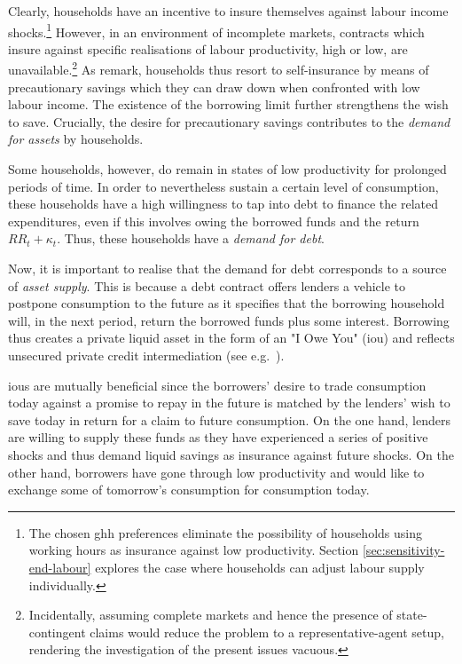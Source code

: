 \documentclass[a4paper,12pt]{article} %
\numberwithin{equation}{section} %
\numberwithin{figure}{section}
\numberwithin{table}{section}
\begin{document}
Clearly, households have an incentive to insure themselves against labour income shocks.\footnote{The chosen \Gls{ghh} preferences eliminate the possibility of households using working hours as insurance against low productivity. Section \ref{sec:sensitivity-end-labour} explores the case where households can adjust labour supply individually.} However, in an environment of incomplete markets, contracts which insure against specific realisations of labour productivity, high or low, are unavailable.\footnote{Incidentally, assuming complete markets and hence the presence of state-contingent claims would reduce the problem to a representative-agent setup, rendering the investigation of the present issues vacuous.} As \textcite{heath2009} remark, households thus resort to self-insurance by means of precautionary savings which they can draw down when confronted with low labour income. The existence of the borrowing limit further strengthens the wish to save. Crucially, the desire for precautionary savings contributes to the \textit{demand for assets} by households. 

Some households, however, do remain in states of low productivity for prolonged periods of time. In order to nevertheless sustain a certain level of consumption, these households have a high willingness to tap into debt to finance the related expenditures, even if this involves owing the borrowed funds and the return $RR_t + \kappa_t$. Thus, these households have a \textit{demand for debt}.

Now, it is important to realise that the demand for debt corresponds to a source of \textit{asset supply}. This is because a debt contract offers lenders a vehicle to postpone consumption to the future as it specifies that the borrowing household will, in the next period, return the borrowed funds plus some interest. Borrowing thus creates a private liquid asset in the form of an "I Owe You" (\Gls{iou}) and reflects unsecured private credit intermediation (see e.g.~\cite{bayer2023}).

\Gls{iou}s are mutually beneficial since the borrowers' desire to trade consumption today against a promise to repay in the future is matched by the lenders' wish to save today in return for a claim to future consumption. On the one hand, lenders are willing to supply these funds as they have experienced a series of positive shocks and thus demand liquid savings as insurance against future shocks. On the other hand, borrowers have gone through low productivity and would like to exchange some of tomorrow's consumption for consumption today.
\end{document}
